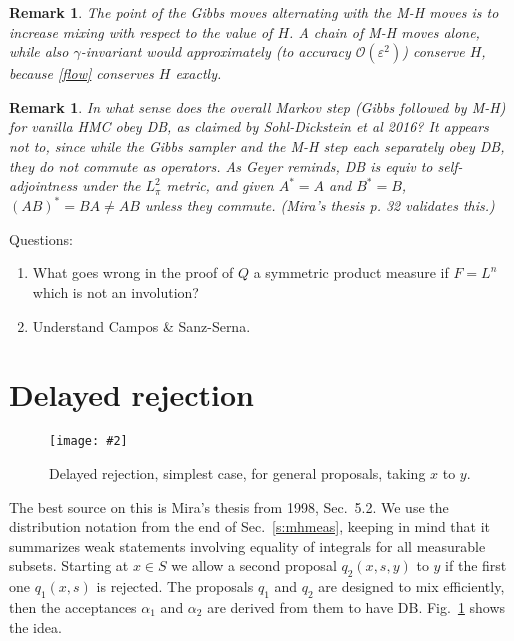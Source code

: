 \documentclass[10pt]{article}
\newcommand{\ben}{\begin{enumerate}}
\newcommand{\een}{\end{enumerate}}
\newcommand{\bfi}{\begin{figure}}
\newcommand{\efi}{\end{figure}}
\newcommand{\ca}[2]{\caption{#1 \label{#2}}}
\newcommand{\ig}[2]{\texttt{[image: \#2]}}
\newcommand{\bigO}{{\mathcal O}}
\newtheorem{rmk}[thm]{Remark}
\newcommand{\al}{\alpha}
\newcommand{\eps}{\varepsilon}
\begin{document}
\begin{rmk}
  The point of the Gibbs moves alternating with the M-H moves
  is to increase mixing with respect to
  the value of $H$. A chain of M-H moves alone, while
  also $\gamma$-invariant would approximately
  (to accuracy $\bigO(\eps^2)$) conserve $H$, because \eqref{flow} conserves
  $H$ exactly.
\end{rmk}

\begin{rmk}
  In what sense does the overall Markov step (Gibbs followed by M-H) for vanilla HMC obey DB, as claimed by Sohl-Dickstein et al 2016?
  It appears not to, since while the Gibbs sampler and the M-H step
  each separately obey DB, they do not commute as operators.
  As Geyer reminds, DB is equiv to self-adjointness under the $L^2_\pi$ metric,
  and given $A^\ast=A$ and $B^\ast=B$,
  $(AB)^\ast = BA \neq AB$ unless they commute. (Mira's thesis p. 32 validates
  this.)
\end{rmk}

Questions:
\ben
\item What goes wrong in the proof of $Q$ a symmetric product measure
  if $F=L^n$ which is not an involution?
\item Understand Campos \& Sanz-Serna.
\een
  




\section{Delayed rejection}

\bfi  %
\centering\ig{width=5in}{Mira.eps}
\ca{Delayed rejection, simplest case, for general proposals, taking
$x$ to $y$.}{f:mira}
\efi

The best source on this is Mira's thesis from 1998, Sec.~5.2.
We use the distribution notation from the end of
Sec.~\ref{s:mhmeas}, keeping in mind that it summarizes
weak statements involving equality of integrals for all measurable subsets.
Starting at $x\in S$ we allow a second proposal $q_2(x,s,y)$ to $y$ if
the first one $q_1(x,s)$ is rejected.
The proposals $q_1$ and $q_2$ are designed to mix efficiently, then
the acceptances $\al_1$ and $\al_2$ are derived from them to have DB.
Fig.~\ref{f:mira} shows the idea.
\end{document}
